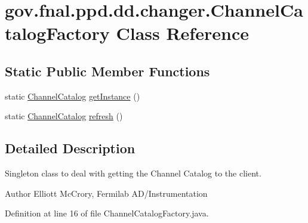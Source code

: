 \hypertarget{classgov_1_1fnal_1_1ppd_1_1dd_1_1changer_1_1ChannelCatalogFactory}{\section{gov.\-fnal.\-ppd.\-dd.\-changer.\-Channel\-Catalog\-Factory Class Reference}
\label{classgov_1_1fnal_1_1ppd_1_1dd_1_1changer_1_1ChannelCatalogFactory}
}
\subsection*{Static Public Member Functions}
\begin{DoxyCompactItemize}
\item 
static \hyperlink{interfacegov_1_1fnal_1_1ppd_1_1dd_1_1changer_1_1ChannelCatalog}{Channel\-Catalog} \hyperlink{classgov_1_1fnal_1_1ppd_1_1dd_1_1changer_1_1ChannelCatalogFactory_ac77dd407ecb474093b11431593b52540}{get\-Instance} ()
\item 
static \hyperlink{interfacegov_1_1fnal_1_1ppd_1_1dd_1_1changer_1_1ChannelCatalog}{Channel\-Catalog} \hyperlink{classgov_1_1fnal_1_1ppd_1_1dd_1_1changer_1_1ChannelCatalogFactory_a10180eb261e098698ee6c87b0d530380}{refresh} ()
\end{DoxyCompactItemize}


\subsection{Detailed Description}
Singleton class to deal with getting the Channel Catalog to the client.

\begin{DoxyAuthor}{Author}
Elliott Mc\-Crory, Fermilab A\-D/\-Instrumentation 
\end{DoxyAuthor}


Definition at line 16 of file Channel\-Catalog\-Factory.\-java.



